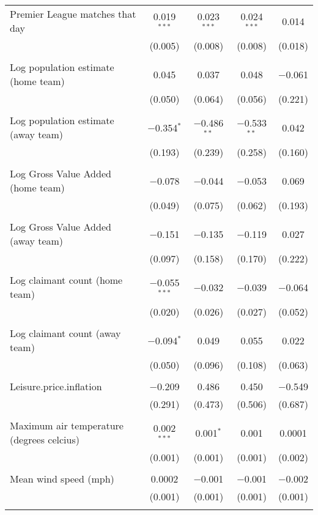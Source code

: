 \begin{tabular}{@{\extracolsep{5pt}}lcccc}
 Premier League matches that day & 0.019$^{***}$ & 0.023$^{***}$ & 0.024$^{***}$ & 0.014 \\ 
  & (0.005) & (0.008) & (0.008) & (0.018) \\ 
  & & & & \\ 
 Log population estimate (home team) & 0.045 & 0.037 & 0.048 & $-$0.061 \\ 
  & (0.050) & (0.064) & (0.056) & (0.221) \\ 
  & & & & \\ 
 Log population estimate (away team) & $-$0.354$^{*}$ & $-$0.486$^{**}$ & $-$0.533$^{**}$ & 0.042 \\ 
  & (0.193) & (0.239) & (0.258) & (0.160) \\ 
  & & & & \\ 
 Log Gross Value Added (home team) & $-$0.078 & $-$0.044 & $-$0.053 & 0.069 \\ 
  & (0.049) & (0.075) & (0.062) & (0.193) \\ 
  & & & & \\ 
 Log Gross Value Added (away team) & $-$0.151 & $-$0.135 & $-$0.119 & 0.027 \\ 
  & (0.097) & (0.158) & (0.170) & (0.222) \\ 
  & & & & \\ 
 Log claimant count (home team) & $-$0.055$^{***}$ & $-$0.032 & $-$0.039 & $-$0.064 \\ 
  & (0.020) & (0.026) & (0.027) & (0.052) \\ 
  & & & & \\ 
 Log claimant count (away team) & $-$0.094$^{*}$ & 0.049 & 0.055 & 0.022 \\ 
  & (0.050) & (0.096) & (0.108) & (0.063) \\ 
  & & & & \\ 
 Leisure.price.inflation & $-$0.209 & 0.486 & 0.450 & $-$0.549 \\ 
  & (0.291) & (0.473) & (0.506) & (0.687) \\ 
  & & & & \\ 
 Maximum air temperature (degrees celcius) & 0.002$^{***}$ & 0.001$^{*}$ & 0.001 & 0.0001 \\ 
  & (0.001) & (0.001) & (0.001) & (0.002) \\ 
  & & & & \\ 
 Mean wind speed (mph) & 0.0002 & $-$0.001 & $-$0.001 & $-$0.002 \\ 
  & (0.001) & (0.001) & (0.001) & (0.001) \\ 
  & & & & \\ 

\end{tabular}
